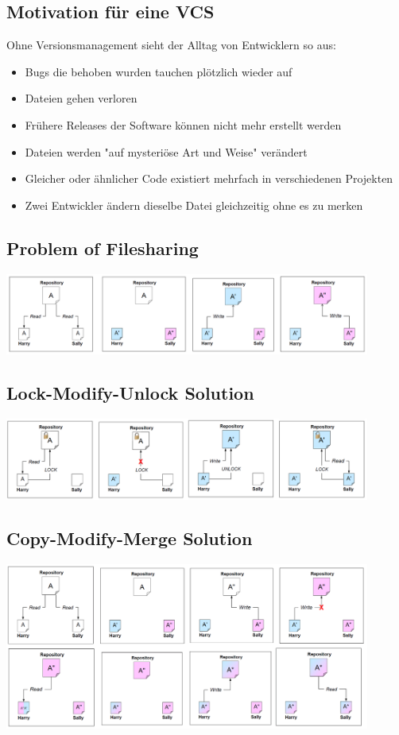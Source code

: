 \documentclass[10pt]{article}
\begin{document}
    \subsection{Motivation f\"ur eine VCS}
    Ohne Versionsmanagement sieht der Alltag von Entwicklern so aus:
    \begin{itemize}
        \item Bugs die behoben wurden tauchen pl\"otzlich wieder auf
        \item Dateien gehen verloren
        \item Fr\"uhere Releases der Software k\"onnen nicht mehr erstellt werden
        \item Dateien werden "auf mysteri\"ose Art und Weise" ver\"andert
        \item Gleicher oder \"ahnlicher Code existiert mehrfach in verschiedenen Projekten
        \item Zwei Entwickler \"andern dieselbe Datei gleichzeitig ohne es zu merken
    \end{itemize}

    \subsection{Problem of Filesharing}
    \includegraphics[width=0.9\textwidth]{assets/problem_of_filesharing.png}

    \subsection{Lock-Modify-Unlock Solution}
    \includegraphics[width=0.9\textwidth]{assets/lock_modify_unlock_solution.png}

    \subsection{Copy-Modify-Merge Solution}
    \includegraphics[width=0.9\textwidth]{assets/copy_modify_merge_solution.png}
\end{document}
